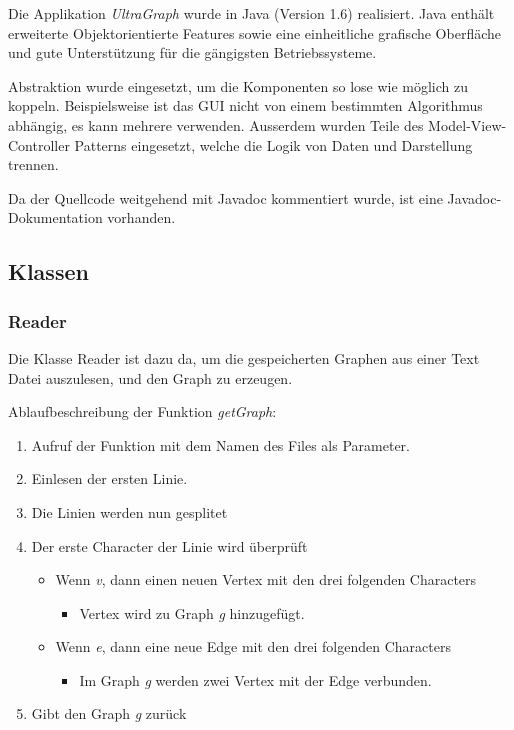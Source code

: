 \documentclass[a4paper,titlepage]{article}
\begin{document}
Die Applikation \emph{UltraGraph} wurde in Java (Version 1.6) realisiert. Java enthält erweiterte Objektorientierte Features sowie eine einheitliche grafische Oberfläche und gute Unterstützung für die gängigsten Betriebssysteme.

Abstraktion wurde eingesetzt, um die Komponenten so lose wie möglich zu koppeln. Beispielsweise ist das GUI nicht von einem bestimmten Algorithmus abhängig, es kann mehrere verwenden. Ausserdem wurden Teile des Model-View-Controller Patterns eingesetzt, welche die Logik von Daten und Darstellung trennen.

Da der Quellcode weitgehend mit Javadoc kommentiert wurde, ist eine Javadoc-Dokumentation vorhanden.

\subsection{Klassen}

\subsubsection{Reader}

Die Klasse Reader ist dazu da, um die gespeicherten Graphen aus einer Text Datei auszulesen, und den Graph zu erzeugen.

Ablaufbeschreibung der Funktion \emph{getGraph}:

\begin{enumerate}
\item Aufruf der Funktion mit dem Namen des Files als Parameter.
\item Einlesen der ersten Linie.
\item Die Linien werden nun gesplitet
\item Der erste Character der Linie wird überprüft
\begin{itemize}\item Wenn \emph{v}, dann einen neuen Vertex mit den drei folgenden Characters
\begin{itemize}\item Vertex wird zu Graph \emph{g} hinzugefügt.\end{itemize}\end{itemize}
\begin{itemize}\item Wenn \emph{e}, dann eine neue Edge mit den drei folgenden Characters
\begin{itemize}\item Im Graph \emph{g} werden zwei Vertex mit der Edge verbunden.\end{itemize}\end{itemize}
\item Gibt den Graph \emph{g} zurück
\end{enumerate}
\end{document}
